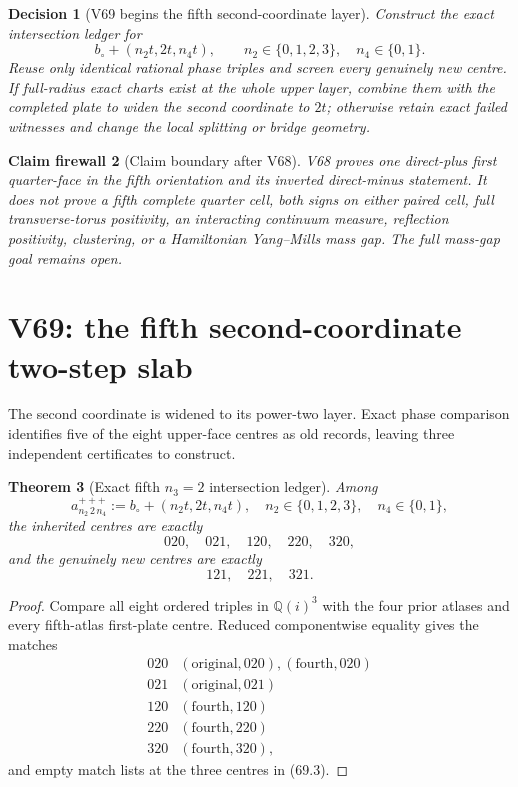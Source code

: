 \documentclass[11pt,oneside]{article}
\newtheorem{theorem}{Theorem}[section]
\newtheorem{firewall}[theorem]{Claim firewall}
\newtheorem{decision}[theorem]{Decision}
\theoremstyle{definition}
\theoremstyle{remark}
\begin{document}
\begin{decision}[V69 begins the fifth second-coordinate layer]
\label{dec:newv68-next}
Construct the exact intersection ledger for
\[
 b_\circ+(n_2t,2t,n_4t),\qquad
 n_2\in\{0,1,2,3\},\quad n_4\in\{0,1\}.              \tag{68.12}
\]
Reuse only identical rational phase triples and screen every
genuinely new centre.  If full-radius exact charts exist at the
whole upper layer, combine them with the completed plate to widen
the second coordinate to \(2t\); otherwise retain exact failed
witnesses and change the local splitting or bridge geometry.
\end{decision}

\begin{firewall}[Claim boundary after V68]
\label{fire:newv68-final}
V68 proves one direct-plus first quarter-face in the fifth
orientation and its inverted direct-minus statement.  It does not
prove a fifth complete quarter cell, both signs on either paired
cell, full transverse-torus positivity, an interacting continuum
measure, reflection positivity, clustering, or a Hamiltonian
Yang--Mills mass gap.  The full mass-gap goal remains open.
\end{firewall}

\section{V69: the fifth second-coordinate two-step slab}
\label{sec:newv69-fifth-second-two-step}

The second coordinate is widened to its power-two layer.  Exact
phase comparison identifies five of the eight upper-face centres as
old records, leaving three independent certificates to construct.

\begin{theorem}[Exact fifth \(n_3=2\) intersection ledger]
\label{thm:newv69-intersections}
Among
\[
 a_{n_2\,2\,n_4}^{+++}
 :=b_\circ+(n_2t,2t,n_4t),
 \quad n_2\in\{0,1,2,3\},\quad n_4\in\{0,1\},         \tag{69.1}
\]
the inherited centres are exactly
\[
 020,\quad021,\quad120,\quad220,\quad320,             \tag{69.2}
\]
and the genuinely new centres are exactly
\[
 121,\quad221,\quad321.                               \tag{69.3}
\]
\end{theorem}

\begin{proof}
Compare all eight ordered triples in \(\mathbb Q(i)^3\) with the
four prior atlases and every fifth-atlas first-plate centre.
Reduced componentwise equality gives the matches
\[
\begin{array}{c|l}
020&(\mathrm{original},020),(\mathrm{fourth},020)\\
021&(\mathrm{original},021)\\
120&(\mathrm{fourth},120)\\
220&(\mathrm{fourth},220)\\
320&(\mathrm{fourth},320),
\end{array}
\]
and empty match lists at the three centres in (69.3).
\end{proof}
\end{document}
